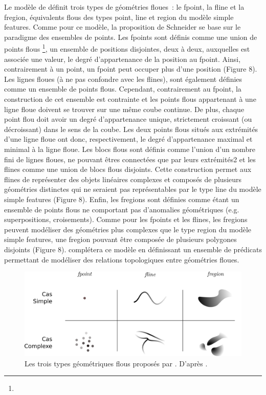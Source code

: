 Le modèle de \textcite{Schneider1999} définit trois types de
géométries floues : le fpoint, la fline et la fregion, équivalents
flous des types point, line et region du modèle simple features. Comme
pour ce modèle, la proposition de Schneider se base sur le paradigme
des ensembles de points. Les fpoints sont définis comme une union de
points flous \footnote{}, \ie un ensemble de positions disjointes,
deux à deux, auxquelles est associée une valeur, le degré
d’appartenance de la position au fpoint. Ainsi, contrairement à un
point, un fpoint peut occuper plus d’une position (Figure 8). Les
lignes floues (à ne pas confondre avec les flines), sont également
définies comme un ensemble de points flous. Cependant, contrairement
au fpoint, la construction de cet ensemble est contrainte et les
points flous appartenant à une ligne floue doivent se trouver sur une
même coube continue. De plus, chaque point flou doit avoir un degré
d’appartenance unique, strictement croissant (ou décroissant) dans le
sens de la coube. Les deux points flous situés aux extrémités d’une
ligne floue ont donc, respectivement, le degré d’appartenance maximal
et minimal à la ligne floue. Les blocs flous sont définis comme
l’union d’un nombre fini de lignes floues, ne pouvant êtres connectées
que par leurs extrémités2 et les flines comme une union de blocs flous
disjoints. Cette construction permet aux flines de représenter des
objets linéaires complexes et composés de plusieurs géométries
distinctes qui ne seraient pas représentables par le type line du
modèle simple features (Figure 8). Enfin, les fregions sont définies
comme étant un ensemble de points flous ne comportant pas d’anomalies
géométriques (e.g. superpositions, croisements). Comme pour les
fpoints et les flines, les fregions peuvent modéliser des géométries
plus complexes que le type region du modèle simple features, une
fregion pouvant être composée de plusieurs polygones disjoints (Figure
8). \textcite{Schneider2004} complétera ce modèle en définissant un
ensemble de prédicats permettant de modéliser des relations
topologiques entre géométries floues.

\begin{figure}
  \centering
  \includegraphics{../figures/fig8.png}
  \caption{Les trois types géométriques flous proposés par
    \textcite{Schneider1999}. D’après \textcite{Schneider1999}.}
  \label{fig:mod_schneider}
\end{figure}

